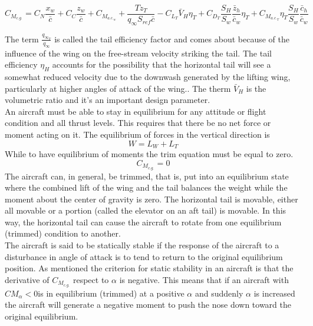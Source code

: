 \begin{equation}
C_{M_{c.g.}} = C_N \frac{x_w}{\bar{c}} + C_C \frac{z_w}{\bar{c}} + C_{M_{a.c._{w}}} + \frac{T z_T}{q_{\infty} S_{ref} \bar{c}} - C_{L_T} \bar{V}_H \eta_T + C_{D_T} \frac{S_H}{S_w}\frac{\bar{z}_h}{\bar{c}_w} \eta_T +  C_{M_{a.c._{T}}} \eta_T \frac{S_H}{S_w}\frac{\bar{c}_h}{\bar{c}_w}
\label{eqstabilitytrim}
\end{equation}

The term $\frac{q_{{\infty}_T}}{q_{\infty}}$ is called the tail efficiency factor and comes about because of the influence of the wing on the free-stream velocity striking the tail. The tail efficiency $\eta_H$ accounts for the possibility that the horizontal tail will see a somewhat reduced velocity due to the downwash generated by the lifting wing, particularly at higher angles of attack of the wing.\cite{sforza2014commercial}. The therm $\bar{V}_H$ is the volumetric ratio and it's an important design parameter. 
\noindent \\

An aircraft must be able to stay in equilibrium for any attitude or flight condition and all thrust levels. This
requires that there be no net force or moment acting on it. The equilibrium of forces in the vertical direction is
\begin{equation}
W = L_W + L_T
\end{equation}
While to have equilibrium of moments the trim equation must be equal to zero. 
\begin{equation}
C_{M_{c.g.}} = 0
\end{equation}
The aircraft can, in general, be trimmed, that is, put into an equilibrium state where the combined lift of the wing and the tail balances the weight while the moment about the center of gravity is zero. The horizontal tail is movable, either all movable or a portion (called the elevator on an aft tail) is movable. In this way, the horizontal tail can cause the aircraft to rotate from one equilibrium (trimmed) condition to another.\cite{nicolai2010fundamentals}\\
 The aircraft is said to be statically stable if the response of the aircraft to a disturbance in angle of attack is to tend to return to the original equilibrium position.
As mentioned the criterion for static stability in an aircraft is that the derivative of $C_{M_{c.g.}}$ respect to $\alpha$ is negative. This means that if an aircraft with $CM_{\alpha} < 0 $is in equilibrium (trimmed) at a positive $\alpha$ and suddenly $\alpha$ is increased the aircraft will generate a negative moment to push the nose down toward the
original equilibrium.

